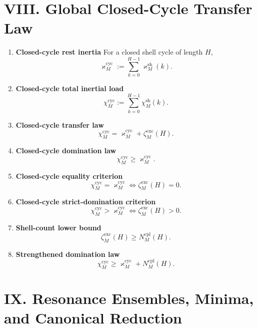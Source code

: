\documentclass[11pt,letterpaper]{article}
\theoremstyle{plain}
\theoremstyle{definition}
\theoremstyle{remark}
\newcommand{\RestInertia}{\varkappa}
\newcommand{\TotInertia}{\chi}
\newcommand{\AccAction}{\zeta}
\begin{document}
\section*{VIII. Global Closed-Cycle Transfer Law}

\begin{enumerate}[resume]
\item \textbf{Closed-cycle rest inertia}
For a closed shell cycle of length \(H\),
\[
\RestInertia_M^{\mathrm{cyc}}:=\sum_{k=0}^{H-1}\RestInertia_M^{\mathrm{sh}}(k).
\]

\item \textbf{Closed-cycle total inertial load}
\[
\TotInertia_M^{\mathrm{cyc}}:=\sum_{k=0}^{H-1}\TotInertia_M^{\mathrm{sh}}(k).
\]

\item \textbf{Closed-cycle transfer law}
\[
\TotInertia_M^{\mathrm{cyc}}
=
\RestInertia_M^{\mathrm{cyc}}+\AccAction_M^{\mathrm{exc}}(H).
\]

\item \textbf{Closed-cycle domination law}
\[
\TotInertia_M^{\mathrm{cyc}}\ge \RestInertia_M^{\mathrm{cyc}}.
\]

\item \textbf{Closed-cycle equality criterion}
\[
\TotInertia_M^{\mathrm{cyc}}=\RestInertia_M^{\mathrm{cyc}}
\iff
\AccAction_M^{\mathrm{exc}}(H)=0.
\]

\item \textbf{Closed-cycle strict-domination criterion}
\[
\TotInertia_M^{\mathrm{cyc}}>\RestInertia_M^{\mathrm{cyc}}
\iff
\AccAction_M^{\mathrm{exc}}(H)>0.
\]

\item \textbf{Shell-count lower bound}
\[
\AccAction_M^{\mathrm{exc}}(H)\ge N_M^{\mathrm{cpl}}(H).
\]

\item \textbf{Strengthened domination law}
\[
\TotInertia_M^{\mathrm{cyc}}
\ge
\RestInertia_M^{\mathrm{cyc}}+N_M^{\mathrm{cpl}}(H).
\]
\end{enumerate}

\section*{IX. Resonance Ensembles, Minima, and Canonical Reduction}
\end{document}
